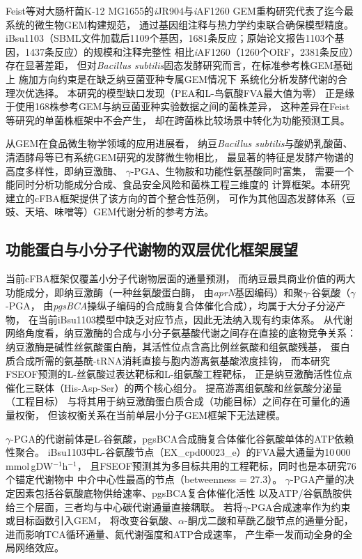\documentclass[10pt, a4paper, twocolumn]{ctexart}
\newcommand{\ibsu}{iBsu1103}
\newcommand{\bs}{\textit{Bacillus subtilis}}
\newcommand{\mmolg}{mmol\,gDW$^{-1}$h$^{-1}$}
\begin{document}
Feist等对大肠杆菌K-12 MG1655的\textit{i}JR904与\textit{i}AF1260
GEM重构研究\citep{Feist2007}代表了迄今最系统的微生物GEM构建规范，
通过基因组注释与热力学约束联合确保模型精度。
\ibsu{}（SBML文件加载后1109个基因，1681条反应；原始论文报告1103个基因，1437条反应）的规模和注释完整性
相比\textit{i}AF1260（1260个ORF，2381条反应）存在显著差距，
但对\bs{}固态发酵研究而言，在标准参考株GEM基础上
施加方向约束是在缺乏纳豆菌亚种专属GEM情况下
系统化分析发酵代谢的合理次优选择。
本研究的模型缺口发现（PEA和L-鸟氨酸FVA最大值为零）
正是缘于使用168株参考GEM与纳豆菌亚种实验数据之间的菌株差异，
这种差异在Feist等研究的单菌株框架中不会产生，
却在跨菌株比较场景中转化为功能预测工具。

从GEM在食品微生物学领域的应用进展看，
纳豆\bs{}与酸奶乳酸菌、清酒酵母等已有系统GEM研究的发酵微生物相比，
最显著的特征是发酵产物谱的高度多样性，即纳豆激酶、
$\gamma$-PGA、生物胺和功能性氨基酸同时富集，
需要一个能同时分析功能成分合成、食品安全风险和菌株工程三维度的
计算框架。本研究建立的cFBA框架提供了该方向的首个整合性范例，
可作为其他固态发酵体系（豆豉、天培、味噌等）GEM代谢分析的参考方法。

\subsection{功能蛋白与小分子代谢物的双层优化框架展望}

当前cFBA框架仅覆盖小分子代谢物层面的通量预测，
而纳豆最具商业价值的两大功能成分，即纳豆激酶（一种丝氨酸蛋白酶，
由\textit{aprN}基因编码）和聚$\gamma$-谷氨酸（$\gamma$-PGA，
由\textit{pgsBCA}操纵子编码的合成酶复合体催化合成），均属于大分子分泌产物，
在当前\ibsu{}模型中缺乏对应节点，因此无法纳入现有约束体系。
从代谢网络角度看，纳豆激酶的合成与小分子氨基酸代谢之间存在直接的底物竞争关系：
纳豆激酶是碱性丝氨酸蛋白酶，其活性位点含高比例丝氨酸和组氨酸残基，
蛋白质合成所需的氨基酰-tRNA消耗直接与胞内游离氨基酸浓度挂钩，
而本研究FSEOF预测的L-丝氨酸过表达靶标和L-组氨酸工程靶标，
正是纳豆激酶活性位点催化三联体（His-Asp-Ser）的两个核心组分。
提高游离组氨酸和丝氨酸分泌量（工程目标）
与将其用于纳豆激酶蛋白质合成（功能目标）之间存在可量化的通量权衡，
但该权衡关系在当前单层小分子GEM框架下无法建模。

$\gamma$-PGA的代谢前体是L-谷氨酸，pgsBCA合成酶复合体催化谷氨酸单体的ATP依赖性聚合。
\ibsu{}中L-谷氨酸节点（EX\_cpd00023\_e）的FVA最大通量为10\,000\,\mmolg{}，
且FSEOF预测其为多目标共用的工程靶标，同时也是本研究76个锚定代谢物中
中介中心性最高的节点（betweenness = 27.3）。
$\gamma$-PGA产量的决定因素包括谷氨酸底物供给速率、pgsBCA复合体催化活性
以及ATP/谷氨酰胺供给三个层面，三者均与中心碳代谢通量直接耦联。
若将$\gamma$-PGA合成速率作为约束或目标函数引入GEM，
将改变谷氨酸、$\alpha$-酮戊二酸和草酰乙酸节点的通量分配，
进而影响TCA循环通量、氮代谢强度和ATP合成速率，
产生牵一发而动全身的全局网络效应。
\end{document}
